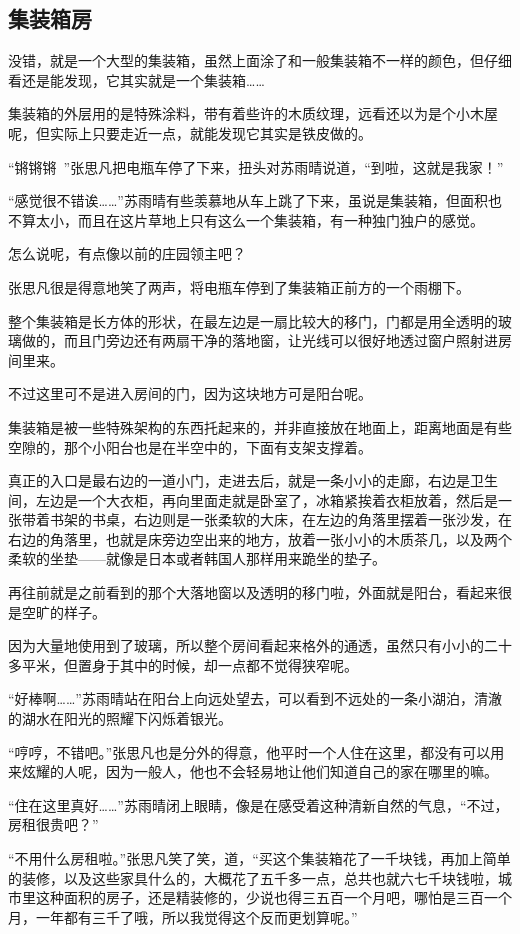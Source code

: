 \subsection{集装箱房}

没错，就是一个大型的集装箱，虽然上面涂了和一般集装箱不一样的颜色，但仔细看还是能发现，它其实就是一个集装箱……

集装箱的外层用的是特殊涂料，带有着些许的木质纹理，远看还以为是个小木屋呢，但实际上只要走近一点，就能发现它其实是铁皮做的。

“锵锵锵~”张思凡把电瓶车停了下来，扭头对苏雨晴说道，“到啦，这就是我家！”

“感觉很不错诶……”苏雨晴有些羡慕地从车上跳了下来，虽说是集装箱，但面积也不算太小，而且在这片草地上只有这么一个集装箱，有一种独门独户的感觉。

怎么说呢，有点像以前的庄园领主吧？

张思凡很是得意地笑了两声，将电瓶车停到了集装箱正前方的一个雨棚下。

整个集装箱是长方体的形状，在最左边是一扇比较大的移门，门都是用全透明的玻璃做的，而且门旁边还有两扇干净的落地窗，让光线可以很好地透过窗户照射进房间里来。

不过这里可不是进入房间的门，因为这块地方可是阳台呢。

集装箱是被一些特殊架构的东西托起来的，并非直接放在地面上，距离地面是有些空隙的，那个小阳台也是在半空中的，下面有支架支撑着。

真正的入口是最右边的一道小门，走进去后，就是一条小小的走廊，右边是卫生间，左边是一个大衣柜，再向里面走就是卧室了，冰箱紧挨着衣柜放着，然后是一张带着书架的书桌，右边则是一张柔软的大床，在左边的角落里摆着一张沙发，在右边的角落里，也就是床旁边空出来的地方，放着一张小小的木质茶几，以及两个柔软的坐垫——就像是日本或者韩国人那样用来跪坐的垫子。

再往前就是之前看到的那个大落地窗以及透明的移门啦，外面就是阳台，看起来很是空旷的样子。

因为大量地使用到了玻璃，所以整个房间看起来格外的通透，虽然只有小小的二十多平米，但置身于其中的时候，却一点都不觉得狭窄呢。

“好棒啊……”苏雨晴站在阳台上向远处望去，可以看到不远处的一条小湖泊，清澈的湖水在阳光的照耀下闪烁着银光。

“哼哼，不错吧。”张思凡也是分外的得意，他平时一个人住在这里，都没有可以用来炫耀的人呢，因为一般人，他也不会轻易地让他们知道自己的家在哪里的嘛。

“住在这里真好……”苏雨晴闭上眼睛，像是在感受着这种清新自然的气息，“不过，房租很贵吧？”

“不用什么房租啦。”张思凡笑了笑，道，“买这个集装箱花了一千块钱，再加上简单的装修，以及这些家具什么的，大概花了五千多一点，总共也就六七千块钱啦，城市里这种面积的房子，还是精装修的，少说也得三五百一个月吧，哪怕是三百一个月，一年都有三千了哦，所以我觉得这个反而更划算呢。”

